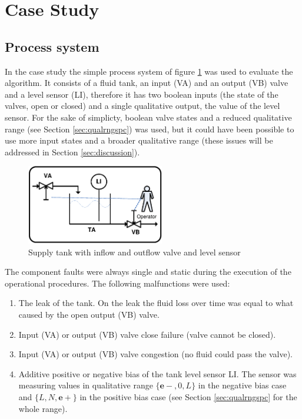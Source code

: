 \documentclass[conference]{IEEEtran}
\begin{document}
\section{Case Study}

\subsection{Process system}
\label{sec:procsys}

In the case study the simple process system of figure \ref{fig:tank} was used to evaluate the algorithm. It consists of a fluid tank, an input (VA) and an output (VB) valve and a level sensor (LI), therefore it has two boolean inputs (the state of the valves, open or closed) and a single qualitative output, the value of the level sensor. For the sake of simplicty, boolean valve states and a reduced qualitative range (see Section \ref{sec:qualrngspc}) was used, but it could have been possible to use more input states and a broader qualitative range (these issues will be addressed in Section \ref{sec:discussion}). 

\begin{figure}[h!]
 \begin{center}
  \includegraphics[width=6cm]{Stank.eps}
  \caption {Supply tank with inflow and outflow valve and level sensor}
  \label{fig:tank}
 \end{center}
\end{figure} 

The component faults were always single and static during the execution of the operational procedures. The following malfunctions were used:
\begin{enumerate}
\item The leak of the tank. On the leak the fluid loss over time was equal to what caused by the open output (VB) valve.
\item Input (VA) or output (VB) valve close failure (valve cannot be closed).
\item Input (VA) or output (VB) valve congestion (no fluid could pass the valve).
\item Additive positive or negative bias of the tank level sensor LI. The sensor was measuring values in qualitative range $\{\mathbf{e-},0,L\}$ in the negative bias case and $\{L,N,\mathbf{e+}\}$ in the positive bias case (see Section \ref{sec:qualrngspc} for the whole range).
\end{enumerate}
\end{document}
